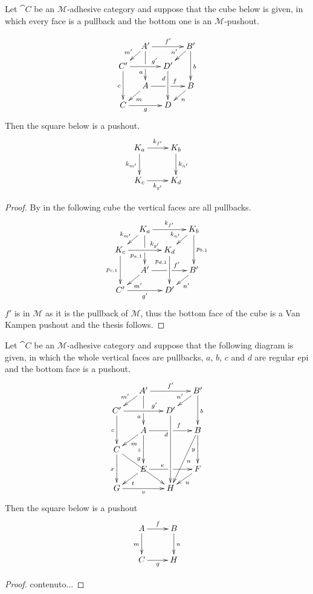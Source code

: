 \begin{lemma}\label{lem:salvavita2}
Let $\cat{C}$ be an $\mathcal{M}$-adhesive category and suppose that the cube below is given, in which every face is a pullback and the bottom one is an $\mathcal{M}$-pushout.

 	\[\xymatrix@C=10pt@R=10pt{&A'\ar[dd]|\hole_(.65){a}\ar[rr]^{f'} \ar[dl]_{m'} && B' \ar[dd]^{b} \ar[dl]_{n'} \\ C'  \ar[dd]_{c}\ar[rr]^(.7){g'} & & D' \ar[dd]_(.3){d}\\&A\ar[rr]|\hole^(.65){f} \ar[dl]^{m} && B \ar[dl]^{n} \\C \ar[rr]_{g} & & D}\]
Then the square below is a pushout.
\[\xymatrix{K_{a} \ar[r]^{k_{f'}}  \ar[d]_{k_{m'}}& K_b \ar[d]^{k_{n'}}\\ K_c \ar[r]_{k_{g'}} & K_d}\]
\end{lemma}
\begin{proof} By  in the following cube the vertical faces are all pullbacks. 
		\[\xymatrix@C=10pt@R=10pt{&K_a\ar[dd]|\hole_(.65){p_{a,1}}\ar[rr]^{k_{f'}} \ar[dl]_{k_{m'}} && K_b \ar[dd]^{p_{b,1}} \ar[dl]_{k_{n'}} \\ K_c  \ar[dd]_{p_{c,1}}\ar[rr]^(.7){k_{g'}} & & K_d \ar[dd]_(.3){p_{d,1}}\\&A'\ar[rr]|\hole^(.65){f'} \ar[dl]^{m'} && B' \ar[dl]^{n'} \\C' \ar[rr]_{g'} & & D'}\]
	$f'$ is in $\mathcal{M}$ as it is the pullback of $\mathcal{M}$, thus the bottom face of the cube is a Van Kampen pushout and the thesis follows.
\end{proof}

\begin{lemma}\label{label:lem:salvavita3}
Let $\cat{C}$ be an $\mathcal{M}$-adhesive category and suppose that the following diagram is given, in which the whole vertical faces are pullbacks, $a$, $b$, $c$ and $d$ are regular epi and the bottom face is a pushout. 
\[\xymatrix@C=15pt@R=10pt{&A'\ar[dd]|\hole_(.65){a}\ar[rr]^{f'} \ar[dl]_{m'} && B' \ar[dd]^{b} \ar[dl]_{n'} \\ C'  \ar[dd]_{c}\ar[rr]^(.7){g'} & & D' \ar[dddd]_(.3){d}\\&A \ar[dd]_{z}\ar[rr]|\hole^(.65){f} \ar[dl]^{m} && B \ar[dd]_{y} \ar[dddl]^{n} \\C \ar[dd]_{x}\ar[ddrr]^(.35){g} & &\\&E\ar[rr]|\hole^(.35){e} \ar[dl]^{t} && F \ar[dl]^{u} \\G \ar[rr]_{v} & & H}\]
Then the square below is a pushout
\[\xymatrix{A \ar[r]^{f}\ar[d]_{m}& B \ar[d]^{n}\\ C \ar[r]_{g} & H}\]
\end{lemma}
\begin{proof}
	contenuto...
\end{proof}



